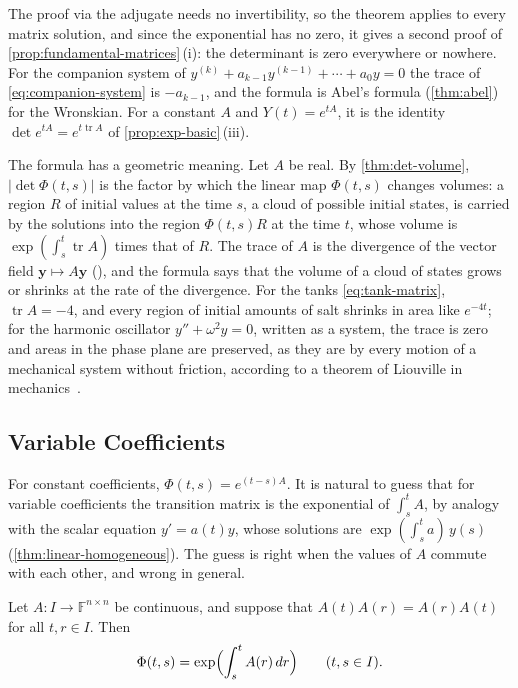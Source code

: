 The proof via the adjugate needs no invertibility, so the theorem applies to every matrix solution, and since the exponential has no zero, it gives a second proof of \cref{prop:fundamental-matrices}\,(i): the determinant is zero everywhere or nowhere. For the companion system of $y^{(k)}+a_{k-1}y^{(k-1)}+\cdots+a_0y=0$ the trace of \eqref{eq:companion-system} is $-a_{k-1}$, and the formula is Abel's formula (\cref{thm:abel}) for the Wronskian. For a constant $A$ and $Y(t)=e^{tA}$, it is the identity $\det e^{tA}=e^{t\operatorname{tr}A}$ of \cref{prop:exp-basic}\,(iii).

The formula has a geometric meaning. Let $A$ be real. By \cref{thm:det-volume}, $|\det\Phi(t,s)|$ is the factor by which the linear map $\Phi(t,s)$ changes volumes: a region $R$ of initial values at the time $s$, a cloud of possible initial states, is carried by the solutions into the region $\Phi(t,s)R$ at the time $t$, whose volume is $\exp(\int_s^t\operatorname{tr}A)$ times that of $R$. The trace of $A$ is the divergence of the vector field $\mathbf y\mapsto A\mathbf y$ (), and the formula says that the volume of a cloud of states grows or shrinks at the rate of the divergence. For the tanks \eqref{eq:tank-matrix}, $\operatorname{tr}A=-4$, and every region of initial amounts of salt shrinks in area like $e^{-4t}$; for the harmonic oscillator $y''+\omega^2y=0$, written as a system, the trace is zero and areas in the phase plane are preserved, as they are by every motion of a mechanical system without friction, according to a theorem of Liouville in mechanics~\cite[Sect.~16]{arnold1989}.

\subsection{Variable Coefficients}

For constant coefficients, $\Phi(t,s)=e^{(t-s)A}$. It is natural to guess that for variable coefficients the transition matrix is the exponential of $\int_s^tA$, by analogy with the scalar equation $y'=a(t)y$, whose solutions are $\exp(\int_s^ta)\,y(s)$ (\cref{thm:linear-homogeneous}). The guess is right when the values of $A$ commute with each other, and wrong in general.

\begin{proposition}
\label{prop:commuting-coefficients}
Let $A\colon I\to\mathbb F^{n\times n}$ be continuous, and suppose that $A(t)A(r)=A(r)A(t)$ for all $t,r\in I$. Then
\[
\Phi(t,s)=\exp\Bigl(\int_s^tA(r)\,dr\Bigr)\qquad(t,s\in I).
\]
\end{proposition}


